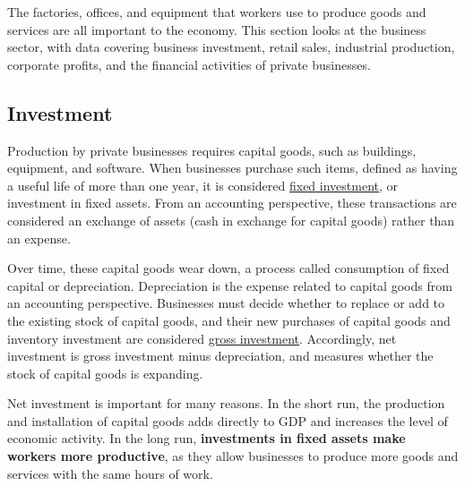 \documentclass{report}
\begin{document}
{\begin{minipage}{0.76\textwidth}  
\small The factories, offices, and equipment that workers use to produce goods and services are all important to the economy. This section looks at the business sector, with data covering business investment, retail sales, industrial production, corporate profits, and the financial activities of private businesses. 

\subsection*{Investment}
\hypertarget{busin}{\label{busin}}
 
\small Production by private businesses requires capital goods, such as buildings, equipment, and software. When businesses purchase such items, defined as having a useful life of more than one year, it is considered \href{https://www.bea.gov/help/glossary/nonresidential-fixed-investment}{fixed investment}, or investment in fixed assets. From an accounting perspective, these transactions are considered an exchange of assets (cash in exchange for capital goods) rather than an expense.

Over time, these capital goods wear down, a process called consumption of fixed capital or depreciation. Depreciation is the expense related to capital goods from an accounting perspective. Businesses must decide whether to replace or add to the existing stock of capital goods, and their new purchases of capital goods and inventory investment are considered \href{https://www.bea.gov/help/glossary/gross-private-domestic-investment}{gross investment}. Accordingly, net investment is gross investment minus depreciation, and measures whether the stock of capital goods is expanding.

Net investment is important for many reasons. In the short run, the production and installation of capital goods adds directly to GDP and increases the level of economic activity. In the long run, \textbf{investments in fixed assets make workers more productive}, as they allow businesses to produce more goods and services with the same hours of work. 
\end{minipage}
\vspace{1mm}

}
\end{document}
